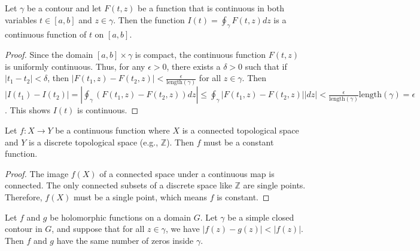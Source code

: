 \begin{lemma}
    \label{lem:Continuity_of_Parametric_Integral}
    Let $\gamma$ be a contour and let $F(t,z)$ be a function that is continuous in both variables $t \in [a,b]$ and $z \in \gamma$. Then the function $I(t) = \oint_\gamma F(t,z) dz$ is a continuous function of $t$ on $[a,b]$.
\end{lemma}

\begin{proof}
    Since the domain $[a,b] \times \gamma$ is compact, the continuous function $F(t,z)$ is uniformly continuous. Thus, for any $\epsilon > 0$, there exists a $\delta > 0$ such that if $|t_1 - t_2| < \delta$, then $|F(t_1, z) - F(t_2, z)| < \frac{\epsilon}{\mathrm{length}(\gamma)}$ for all $z \in \gamma$. Then $|I(t_1) - I(t_2)| = \left|\oint_\gamma (F(t_1,z) - F(t_2,z)) dz\right| \le \oint_\gamma |F(t_1,z) - F(t_2,z)| |dz| < \frac{\epsilon}{\mathrm{length}(\gamma)} \mathrm{length}(\gamma) = \epsilon$. This shows $I(t)$ is continuous.
\end{proof}

\begin{lemma}
    \label{lem:Continuity_of_Integer_Valued_Function}
    Let $f: X \to Y$ be a continuous function where $X$ is a connected topological space and $Y$ is a discrete topological space (e.g., $\mathbb{Z}$). Then $f$ must be a constant function.
\end{lemma}

\begin{proof}
    The image $f(X)$ of a connected space under a continuous map is connected. The only connected subsets of a discrete space like $\mathbb{Z}$ are single points. Therefore, $f(X)$ must be a single point, which means $f$ is constant.
\end{proof}

\begin{lemma}
    \label{lem:Rouche's_Theorem}
    Let $f$ and $g$ be holomorphic functions on a domain $G$. Let $\gamma$ be a simple closed contour in $G$, and suppose that for all $z \in \gamma$, we have $|f(z) - g(z)| < |f(z)|$. Then $f$ and $g$ have the same number of zeros inside $\gamma$.
\end{lemma}

